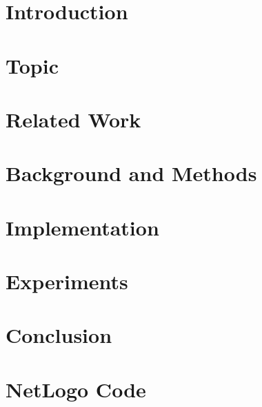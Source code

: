 \documentclass[12pt]{report}
\begin{document}



\pagestyle{fancy}
\rfoot{\thepage}
\cfoot{}






\newpage
\tableofcontents
\listoffigures
\listoftables
\clearpage


\pagestyle{plain}

\chapter{Introduction}
\label{sec:intro}


\chapter{Topic}
\label{sec:Slimemold}


\chapter{Related Work}
\label{sec:relatedwork}


\chapter{Background and Methods}
\label{sec:methods}


\chapter{Implementation}
\label{sec:implementation}


\chapter{Experiments}
\label{sec:experiments}


\chapter{Conclusion}
\label{sec:conclusion}


\newpage




\newpage

\appendix
{}
\chapter{NetLogo Code}
\label{sec:appendix-netlogo}



\end{document}
